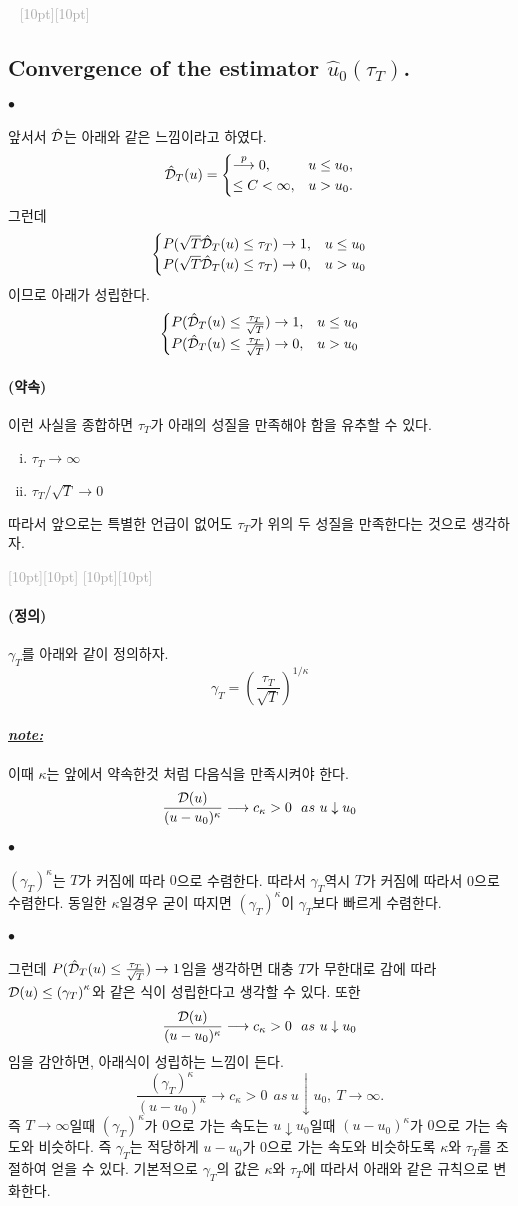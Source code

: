 \documentclass[12pt,oneside,english]{book}
\newcommand{\dash}{\vspace{2em}\noindent \textcolor{darkgray}{\hrulefill~ \raisebox{-2.5pt}[10pt][10pt]{\leafright \decofourleft \decothreeleft  \aldineright \decotwo \floweroneleft \decoone   \floweroneright \decotwo \aldineleft\decothreeright \decofourright \leafleft} ~  \hrulefill \\ \vspace{2em}}}
\newcommand{\rdash}{\noindent \textcolor{darkgray}{ \raisebox{-1.9pt}[10pt][10pt]{\leafright} \hrulefill \raisebox{-1.9pt}[10pt][10pt]{\leafright \decofourleft \decothreeleft  \aldineright \decotwo \floweroneleft \decoone}}}
\def\ck{\paragraph{\Large$\bullet$}\Large}
\def\dfn{\paragraph{\Large(정의)}\Large}
\def\promise{\paragraph{\Large(약속)}\Large}
\def\note{\paragraph{\Large\textit{\underline{note:}}}\Large}
\begin{document}
\dash 
\subsection{Convergence of the estimator $\hat{u}_0(\tau_T)$.}

\ck
앞서서 $\hat{\cal D}$는 아래와 같은 느낌이라고 하였다. 
$$\hat{\cal D}_T(u)=\begin{cases}
\overset{p}{\longrightarrow} 0 ,& u\leq u_0, \\ 
\leq C < \infty, & u>u_0.
\end{cases}$$
그런데  
$$\begin{cases}
P(\sqrt{T}\hat{\cal D}_T(u)\leq \tau_T) \rightarrow 1, &u\leq u_0 \\ 
P(\sqrt{T}\hat{\cal D}_T(u)\leq \tau_T) \rightarrow 0, &u > u_0
\end{cases}$$
이므로 아래가 성립한다. 
$$\begin{cases}
P(\hat{\cal D}_T(u)\leq \frac{\tau_T}{\sqrt{T}}) \rightarrow 1, &u\leq u_0 \\ 
P(\hat{\cal D}_T(u)\leq \frac{\tau_T}{\sqrt{T}}) \rightarrow 0, &u > u_0
\end{cases}$$

\promise 이런 사실을 종합하면 $\tau_T$가 아래의 성질을 만족해야 함을 유추할 수 있다. 
\begin{enumerate}[(i)]
\item  $\tau_T \longrightarrow \infty$ 
\item  $\tau_T/\sqrt{T} \longrightarrow 0$ 
\end{enumerate}
따라서 앞으로는 특별한 언급이 없어도 $\tau_T$가 위의 두 성질을 만족한다는 것으로 생각하자. 

\rdash 

\dfn
$\gamma_T$를 아래와 같이 정의하자. 
$$\gamma_T=\left(\frac{\tau_T}{\sqrt{T}}\right)^{1 / \kappa}$$

\note 이때 $\kappa$는 앞에서 약속한것 처럼 다음식을 만족시켜야 한다. 
$$\frac{{\cal D}(u)}{(u-u_0)^{\kappa}} \longrightarrow c_{\kappa} >0~~as~ u\downarrow u_0$$

\ck $\left(\gamma_T\right)^{\kappa}$는 $T$가 커짐에 따라 $0$으로 수렴한다. 따라서 $\gamma_T$역시 $T$가 커짐에 따라서 0으로 수렴한다. 동일한 $\kappa$일경우 굳이 따지면 $\left(\gamma_T\right)^{\kappa}$이 $\gamma_T$보다 빠르게 수렴한다. 

\ck 
그런데 $P(\hat{\cal D}_T(u)\leq \frac{\tau_T}{\sqrt{T}}) \rightarrow 1$임을 생각하면 대충 $T$가 무한대로 감에 따라 ${\cal D}(u)\leq \left(\gamma_T\right)^{\kappa}$와 같은 식이 성립한다고 생각할 수 있다. 또한 
$$\frac{{\cal D}(u)}{(u-u_0)^{\kappa}} \longrightarrow c_{\kappa} >0~~as~ u\downarrow u_0$$
임을 감안하면, 아래식이 성립하는 느낌이 든다. 
$$\frac{\left(\gamma_T\right)^{\kappa}}{(u-u_0)^{\kappa}} \longrightarrow c_{\kappa} >0~~as~ u\downarrow u_0,~T\rightarrow \infty.$$
즉 $T \rightarrow \infty$일때 $(\gamma_T)^{\kappa}$가 $0$으로 가는 속도는 $u\downarrow u_0$일때 $(u-u_0)^{\kappa}$가 $0$으로 가는 속도와 비슷하다. 즉 $\gamma_T$는 적당하게 $u-u_0$가 $0$으로 가는 속도와 비슷하도록 $\kappa$와 $\tau_T$를 조절하여 얻을 수 있다. 기본적으로 $\gamma_T$의 값은 $\kappa$와 $\tau_T$에 따라서 아래와 같은 규칙으로 변화한다. 
\end{document}
